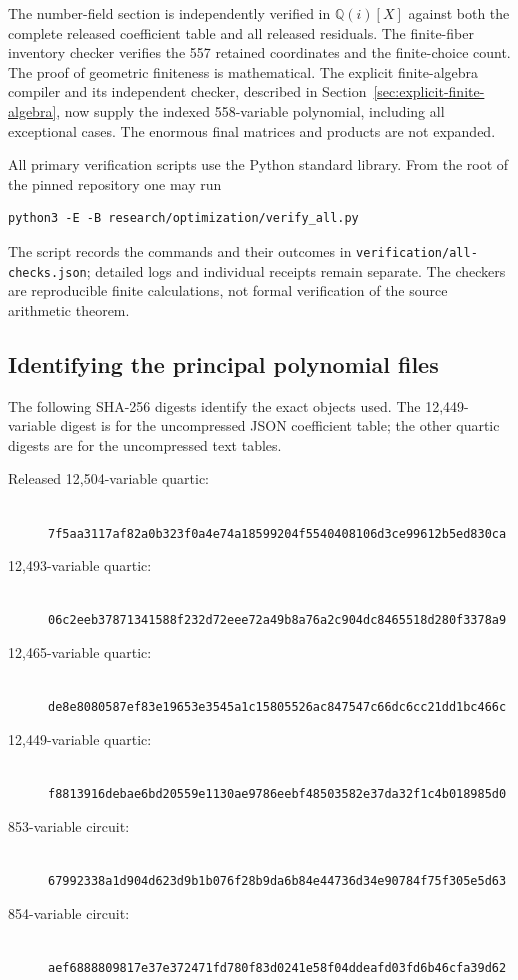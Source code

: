 \documentclass[11pt]{article}
\theoremstyle{definition}
\newcommand{\Q}{\mathbb Q}
\begin{document}
The number-field section is independently verified in $\Q(i)[X]$
against both the complete released coefficient table and all released
residuals. The finite-fiber inventory checker verifies the 557 retained
coordinates and the finite-choice count. The proof of geometric
finiteness is mathematical. The explicit finite-algebra compiler and its
independent checker, described in Section~\ref{sec:explicit-finite-algebra},
now supply the indexed 558-variable polynomial, including all exceptional
cases. The enormous final matrices and products are not expanded.

All primary verification scripts use the Python standard library. From
the root of the pinned repository one may run
\begin{verbatim}
python3 -E -B research/optimization/verify_all.py
\end{verbatim}
The script records the commands and their outcomes in
\nolinkurl{verification/all-checks.json}; detailed logs and individual
receipts remain separate. The checkers are reproducible finite
calculations, not formal verification of the source arithmetic theorem.

\subsection{Identifying the principal polynomial files}

The following SHA-256 digests identify the exact objects used. The
12,449-variable digest is for the uncompressed JSON coefficient table;
the other quartic digests are for the uncompressed text tables.
\begin{description}
\item[Released 12,504-variable quartic:]
\mbox{}\\\nolinkurl{7f5aa3117af82a0b323f0a4e74a18599204f5540408106d3ce99612b5ed830ca}
\item[12,493-variable quartic:]
\mbox{}\\\nolinkurl{06c2eeb37871341588f232d72eee72a49b8a76a2c904dc8465518d280f3378a9}
\item[12,465-variable quartic:]
\mbox{}\\\nolinkurl{de8e8080587ef83e19653e3545a1c15805526ac847547c66dc6cc21dd1bc466c}
\item[12,449-variable quartic:]
\mbox{}\\\nolinkurl{f8813916debae6bd20559e1130ae9786eebf48503582e37da32f1c4b018985d0}
\item[853-variable circuit:]
\mbox{}\\\nolinkurl{67992338a1d904d623d9b1b076f28b9da6b84e44736d34e90784f75f305e5d63}
\item[854-variable circuit:]
\mbox{}\\\nolinkurl{aef6888809817e37e372471fd780f83d0241e58f04ddeafd03fd6b46cfa39d62}
\end{description}
\end{document}
